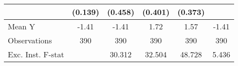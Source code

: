 {\begin{tabular}{l*{5}{c}}
            &     (0.139)         &     (0.458)         &     (0.401)         &     (0.373)         &                     \\
\midrule
Mean Y      &       -1.41         &       -1.41         &        1.72         &        1.57         &       -1.41         \\
Observations&         390         &         390         &         390         &         390         &         390         \\
Exc. Inst. F-stat&                     &      30.312         &      32.504         &      48.728         &       5.436         \\
\bottomrule
\end{tabular}
}
